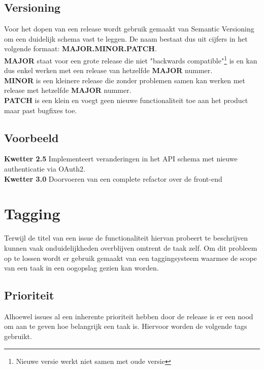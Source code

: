 \subsection{Versioning}

Voor het dopen van een release wordt gebruik gemaakt van Semantic Versioning\cite{semver1} om een duidelijk schema vast te leggen. De naam bestaat dus uit cijfers in het volgende formaat: \textbf{MAJOR.MINOR.PATCH}. \\

\textbf{MAJOR} staat voor een grote release die niet "backwards compatible"\footnote{Nieuwe versie werkt niet samen met oude versie} is en kan dus enkel werken met een release van hetzelfde \textbf{MAJOR} nummer.\\

\textbf{MINOR} is een kleinere release die zonder problemen samen kan werken met release met hetzelfde \textbf{MAJOR} nummer. \\

\textbf{PATCH} is een klein en voegt geen nieuwe functionaliteit toe aan het product maar past bugfixes toe.

\subsection{Voorbeeld}

\textbf{Kwetter 2.5}
Implementeert veranderingen in het API schema met nieuwe authenticatie via OAuth2. \\

\textbf{Kwetter 3.0}
Doorvoeren van een complete refactor over de front-end

\section{Tagging}

Terwijl de titel van een issue de functionaliteit hiervan probeert te beschrijven kunnen vaak onduidelijkheden overblijven omtrent de taak zelf. Om dit probleem op te lossen wordt er gebruik gemaakt van een taggingsysteem waarmee de scope van een taak in een oogopslag gezien kan worden.

\subsection{Prioriteit}

Alhoewel issues al een inherente prioriteit hebben door de release is er een nood om aan te geven hoe belangrijk een taak is. Hiervoor worden de volgende tags gebruikt. 

